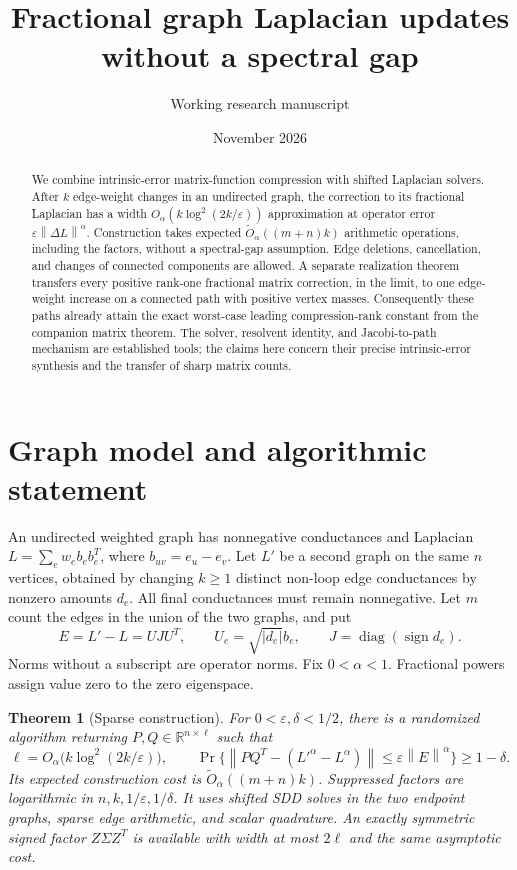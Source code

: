\documentclass[11pt]{article}
\title{Fractional graph Laplacian updates without a spectral gap}
\author{Working research manuscript}
\date{November 2026}
\newtheorem{theorem}{Theorem}[section]
\newcommand{\R}{\mathbb R}
\newcommand{\norm}[1]{\left\lVert#1\right\rVert}
\begin{document}
\maketitle
\begin{abstract}
We combine intrinsic-error matrix-function compression with shifted
Laplacian solvers. After $k$ edge-weight changes in an undirected graph,
the correction to its fractional Laplacian has a width
$O_\alpha(k\log^2(2k/\varepsilon))$ approximation at operator error
$\varepsilon\norm{\Delta L}^\alpha$. Construction takes expected
$\widetilde O_\alpha((m+n)k)$ arithmetic operations, including the
factors, without a spectral-gap assumption. Edge deletions, cancellation,
and changes of connected components are allowed. A separate realization
theorem transfers every positive rank-one fractional matrix correction,
in the limit, to one edge-weight increase on a connected path with
positive vertex masses. Consequently these paths already attain the
exact worst-case leading compression-rank constant from the companion
matrix theorem. The solver, resolvent identity, and Jacobi-to-path
mechanism are established tools; the claims here concern their precise
intrinsic-error synthesis and the transfer of sharp matrix counts.
\end{abstract}

\section{Graph model and algorithmic statement}
An undirected weighted graph has nonnegative conductances and Laplacian
$L=\sum_e w_e b_e b_e^T$, where $b_{uv}=e_u-e_v$.
Let $L'$ be a second graph on the same $n$ vertices, obtained by changing
$k\ge1$ distinct non-loop edge conductances by nonzero amounts $d_e$.
All final conductances must remain nonnegative. Let $m$ count the edges
in the union of the two graphs, and put
\[
 E=L'-L=UJU^T,\qquad
 U_e=\sqrt{|d_e|}b_e,\qquad J=\operatorname{diag}(\operatorname{sign}d_e).
\]
Norms without a subscript are operator norms. Fix $0<\alpha<1$.
Fractional powers assign value zero to the zero eigenspace.

\begin{theorem}[Sparse construction]\label{thm:algorithm}
For $0<\varepsilon,\delta<1/2$, there is a randomized algorithm returning
$P,Q\in\R^{n\times\ell}$ such that
\[
 \ell=O_\alpha\bigl(k\log^2(2k/\varepsilon)\bigr),\qquad
 \Pr\{\norm{PQ^T-(L'^\alpha-L^\alpha)}
              \le\varepsilon\norm E^\alpha\}\ge1-\delta.
\]
Its expected construction cost is $\widetilde O_\alpha((m+n)k)$.
Suppressed factors are logarithmic in $n,k,1/\varepsilon,1/\delta$.
It uses shifted SDD solves in the two
endpoint graphs, sparse edge arithmetic, and scalar quadrature.
An exactly symmetric signed factor $Z\Sigma Z^T$ is available with
width at most $2\ell$ and the same asymptotic cost.
\end{theorem}
\end{document}
